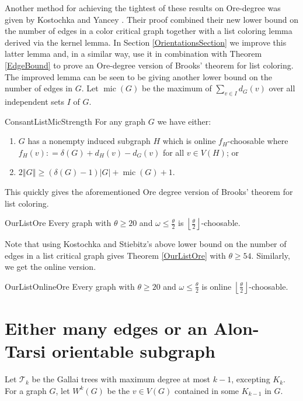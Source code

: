\documentclass[12pt]{article}
\theoremstyle{plain}
\theoremstyle{definition}
\theoremstyle{remark}
\newcommand{\fancy}[1]{\mathcal{#1}}
\newcommand{\T}{\fancy{T}}
\newcommand{\card}[1]{\left|#1\right|}
\newcommand{\size}[1]{\left\Vert#1\right\Vert}
\newcommand{\floor}[1]{\left\lfloor#1\right\rfloor}
\newcommand{\DefinedAs}{\mathrel{\mathop:}=}
\newcommand{\mic}{\operatorname{mic}}
\begin{document}
Another method for achieving the tightest of these results on Ore-degree was given by Kostochka and Yancey \cite{kostochkayancey2012ore}.  Their proof combined their new lower bound on the number of edges in a color critical graph together with a list coloring lemma derived via the kernel lemma.  In Section \ref{OrientationsSection} we improve this latter lemma and, in a similar way, use it in combination with Theorem \ref{EdgeBound} to prove an Ore-degree version of Brooks' theorem for list coloring.  The improved lemma can be seen to be giving another lower bound on the number of edges in $G$. Let $\mic(G)$ be the maximum of $\sum_{v \in I} d_G(v)$ over all independent sets $I$ of $G$.

\begin{repthm}{ConsantListMicStrength}
For any graph $G$ we have either:
\begin{enumerate}
\item $G$ has a nonempty induced subgraph $H$ which is online $f_H$-choosable where $f_H(v) \DefinedAs \delta(G) + d_H(v) - d_G(v)$ for all $v \in V(H)$; or
\item $2\size{G} \geq (\delta(G) - 1)\card{G} + \mic(G) + 1$.
\end{enumerate}
\end{repthm}

\noindent This quickly gives the aforementioned Ore degree version of Brooks' theorem for list coloring.

\begin{repthm}{OurListOre}
Every graph with $\theta \geq 20$ and $\omega \leq \frac{\theta}{2}$ is $\floor{\frac{\theta}{2}}$-choosable.
\end{repthm}

\noindent Note that using Kostochka and Stiebitz's above lower bound on the number of edges in a list critical graph gives Theorem \ref{OurListOre} with $\theta \geq 54$. Similarly, we get the online version.

\begin{repthm}{OurListOnlineOre}
Every graph with $\theta \geq 20$ and $\omega \leq \frac{\theta}{2}$ is online $\floor{\frac{\theta}{2}}$-choosable.
\end{repthm}

\section{Either many edges or an Alon-Tarsi orientable subgraph}
Let $\T_k$ be the Gallai trees with maximum degree at most $k-1$, excepting $K_k$. For a graph $G$, let $W^k(G)$ be the $v \in V(G)$ contained in some $K_{k-1}$ in $G$. 
\end{document}
